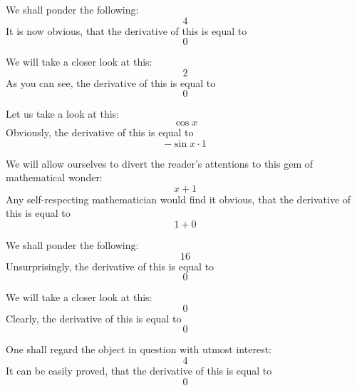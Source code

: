 \documentclass{article}
\begin{document}
We shall ponder the following:
\begin{equation}
4 
\end{equation}
It is now obvious, that the derivative of this is equal to
\begin{equation}
0 
\end{equation}

We will take a closer look at this:
\begin{equation}
2 
\end{equation}
As you can see, the derivative of this is equal to
\begin{equation}
0 
\end{equation}

Let us take a look at this:
\begin{equation}
\cos x 
\end{equation}
Obviously, the derivative of this is equal to
\begin{equation}
-\sin x \cdot 1 
\end{equation}

We will allow ourselves to divert the reader's attentions to this gem of mathematical wonder:
\begin{equation}
x + 1 
\end{equation}
Any self-respecting mathematician would find it obvious, that the derivative of this is equal to
\begin{equation}
1 + 0 
\end{equation}

We shall ponder the following:
\begin{equation}
16 
\end{equation}
Unsurprisingly, the derivative of this is equal to
\begin{equation}
0 
\end{equation}

We will take a closer look at this:
\begin{equation}
0 
\end{equation}
Clearly, the derivative of this is equal to
\begin{equation}
0 
\end{equation}

One shall regard the object in question with utmost interest:
\begin{equation}
4 
\end{equation}
It can be easily proved, that the derivative of this is equal to
\begin{equation}
0 
\end{equation}
\end{document}
